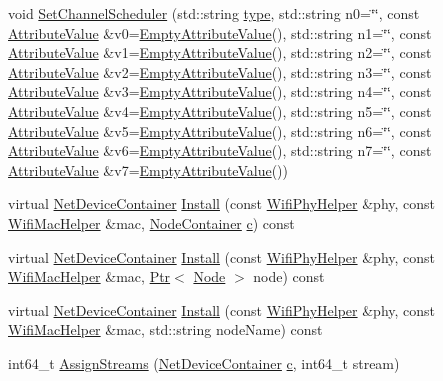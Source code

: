 \begin{DoxyCompactItemize}
void \hyperlink{classns3_1_1WaveHelper_ae5a3a17be003de6ba1e7e436da6478c6}{Set\+Channel\+Scheduler} (std\+::string \hyperlink{visualizer-ideas_8txt_add98db9e15e2a58cf2b57623e7aa893a}{type}, std\+::string n0=\char`\"{}\char`\"{}, const \hyperlink{classns3_1_1AttributeValue}{Attribute\+Value} \&v0=\hyperlink{classns3_1_1EmptyAttributeValue}{Empty\+Attribute\+Value}(), std\+::string n1=\char`\"{}\char`\"{}, const \hyperlink{classns3_1_1AttributeValue}{Attribute\+Value} \&v1=\hyperlink{classns3_1_1EmptyAttributeValue}{Empty\+Attribute\+Value}(), std\+::string n2=\char`\"{}\char`\"{}, const \hyperlink{classns3_1_1AttributeValue}{Attribute\+Value} \&v2=\hyperlink{classns3_1_1EmptyAttributeValue}{Empty\+Attribute\+Value}(), std\+::string n3=\char`\"{}\char`\"{}, const \hyperlink{classns3_1_1AttributeValue}{Attribute\+Value} \&v3=\hyperlink{classns3_1_1EmptyAttributeValue}{Empty\+Attribute\+Value}(), std\+::string n4=\char`\"{}\char`\"{}, const \hyperlink{classns3_1_1AttributeValue}{Attribute\+Value} \&v4=\hyperlink{classns3_1_1EmptyAttributeValue}{Empty\+Attribute\+Value}(), std\+::string n5=\char`\"{}\char`\"{}, const \hyperlink{classns3_1_1AttributeValue}{Attribute\+Value} \&v5=\hyperlink{classns3_1_1EmptyAttributeValue}{Empty\+Attribute\+Value}(), std\+::string n6=\char`\"{}\char`\"{}, const \hyperlink{classns3_1_1AttributeValue}{Attribute\+Value} \&v6=\hyperlink{classns3_1_1EmptyAttributeValue}{Empty\+Attribute\+Value}(), std\+::string n7=\char`\"{}\char`\"{}, const \hyperlink{classns3_1_1AttributeValue}{Attribute\+Value} \&v7=\hyperlink{classns3_1_1EmptyAttributeValue}{Empty\+Attribute\+Value}())
\item 
virtual \hyperlink{classns3_1_1NetDeviceContainer}{Net\+Device\+Container} \hyperlink{classns3_1_1WaveHelper_aed0008e7f56ba14868356b45dd4eab81}{Install} (const \hyperlink{classns3_1_1WifiPhyHelper}{Wifi\+Phy\+Helper} \&phy, const \hyperlink{classns3_1_1WifiMacHelper}{Wifi\+Mac\+Helper} \&mac, \hyperlink{classns3_1_1NodeContainer}{Node\+Container} \hyperlink{mmwave_2model_2fading-traces_2fading__trace__generator_8m_ae0323a9039add2978bf5b49550572c7c}{c}) const 
\item 
virtual \hyperlink{classns3_1_1NetDeviceContainer}{Net\+Device\+Container} \hyperlink{classns3_1_1WaveHelper_a90e135ff0d3d4289cc4cdbdc05d17acc}{Install} (const \hyperlink{classns3_1_1WifiPhyHelper}{Wifi\+Phy\+Helper} \&phy, const \hyperlink{classns3_1_1WifiMacHelper}{Wifi\+Mac\+Helper} \&mac, \hyperlink{classns3_1_1Ptr}{Ptr}$<$ \hyperlink{classns3_1_1Node}{Node} $>$ node) const 
\item 
virtual \hyperlink{classns3_1_1NetDeviceContainer}{Net\+Device\+Container} \hyperlink{classns3_1_1WaveHelper_a0f657388a977dd54d80f2b0ba3dc468c}{Install} (const \hyperlink{classns3_1_1WifiPhyHelper}{Wifi\+Phy\+Helper} \&phy, const \hyperlink{classns3_1_1WifiMacHelper}{Wifi\+Mac\+Helper} \&mac, std\+::string node\+Name) const 
\item 
int64\+\_\+t \hyperlink{classns3_1_1WaveHelper_a0dfb77567421c264b7f227eb6b306dee}{Assign\+Streams} (\hyperlink{classns3_1_1NetDeviceContainer}{Net\+Device\+Container} \hyperlink{mmwave_2model_2fading-traces_2fading__trace__generator_8m_ae0323a9039add2978bf5b49550572c7c}{c}, int64\+\_\+t stream)
\end{DoxyCompactItemize}
